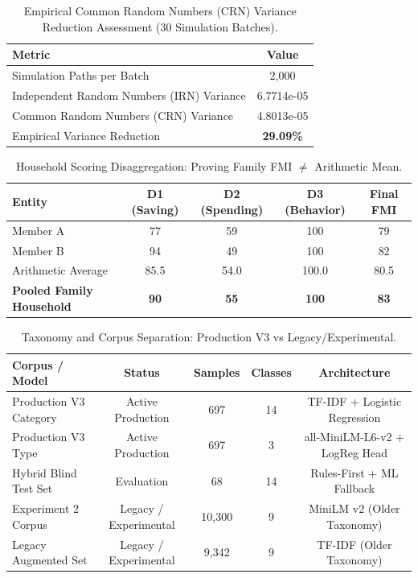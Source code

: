 \begin{table}[t]
\centering
\caption{Empirical Common Random Numbers (CRN) Variance Reduction Assessment (30 Simulation Batches).}
\label{tab:crn_variance}
\begin{tabular}{lc}
\hline
\textbf{Metric} & \textbf{Value} \\
\hline
Simulation Paths per Batch & 2,000 \\
Independent Random Numbers (IRN) Variance & 6.7714e-05 \\
Common Random Numbers (CRN) Variance & 4.8013e-05 \\
Empirical Variance Reduction & \textbf{29.09\%} \\
\hline
\end{tabular}
\end{table}
\begin{table}[t]
\centering
\caption{Household Scoring Disaggregation: Proving Family FMI $\neq$ Arithmetic Mean.}
\label{tab:family_fmi}
\begin{tabular}{lcccc}
\hline
\textbf{Entity} & \textbf{D1 (Saving)} & \textbf{D2 (Spending)} & \textbf{D3 (Behavior)} & \textbf{Final FMI} \\
\hline
Member A & 77 & 59 & 100 & 79 \\
Member B & 94 & 49 & 100 & 82 \\
Arithmetic Average & 85.5 & 54.0 & 100.0 & 80.5 \\
\textbf{Pooled Family Household} & \textbf{90} & \textbf{55} & \textbf{100} & \textbf{83} \\
\hline
\end{tabular}
\end{table}
\begin{table}[t]
\centering
\caption{Taxonomy and Corpus Separation: Production V3 vs Legacy/Experimental.}
\label{tab:corpus_separation}
\begin{tabular}{lcccc}
\hline
\textbf{Corpus / Model} & \textbf{Status} & \textbf{Samples} & \textbf{Classes} & \textbf{Architecture} \\
\hline
Production V3 Category & Active Production & 697 & 14 & TF-IDF + Logistic Regression \\
Production V3 Type & Active Production & 697 & 3 & all-MiniLM-L6-v2 + LogReg Head \\
Hybrid Blind Test Set & Evaluation & 68 & 14 & Rules-First + ML Fallback \\
Experiment 2 Corpus & Legacy / Experimental & 10,300 & 9 & MiniLM v2 (Older Taxonomy) \\
Legacy Augmented Set & Legacy / Experimental & 9,342 & 9 & TF-IDF (Older Taxonomy) \\
\hline
\end{tabular}
\end{table}

